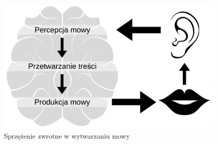 \documentclass[eng,printmode]{mgr}
\begin{document}
\begin{figure}
	 \begin{center}
	 	\includegraphics[scale=0.25]{feedback.png}
	 	\caption{Sprzężenie zwrotne w wytwarzaniu mowy} 	
	 \end{center}
 \end{figure}
 
\end{document}
